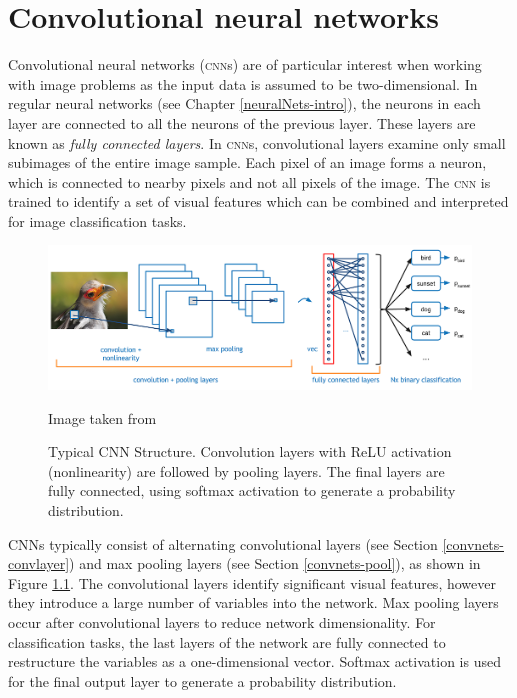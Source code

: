 


\chapter{Convolutional neural networks}\label{convnets}

Convolutional neural networks (\textsc{cnn}s) are of particular interest when working with image problems as the input data is assumed to be two-dimensional. In regular neural networks (see Chapter \ref{neuralNets-intro}), the neurons in each layer are connected to all the neurons of the previous layer. These layers are known as \textit{fully connected layers}. In \textsc{cnn}s, convolutional layers examine only small subimages of the entire image sample. Each pixel of an image forms a neuron, which is connected to nearby pixels and not all pixels of the image. The \textsc{cnn} is trained to identify a set of visual features which can be combined and interpreted for image classification tasks.

\begin{figure}[ht]
	\centering
	\includegraphics[width=\textwidth]{Images/4_cnn_structure.png}
	\caption{Typical CNN Structure. Convolution layers with ReLU activation (nonlinearity) are followed by pooling layers. The final layers are fully connected, using softmax activation to generate a probability distribution.}
	\small Image taken from \cite{ADeshpande2016}
	\label{convnets-structurefig}
\end{figure}

CNNs typically consist of alternating convolutional layers (see Section \ref{convnets-convlayer}) and max pooling layers (see Section \ref{convnets-pool}), as shown in Figure \ref{convnets-structurefig}. The convolutional layers identify significant visual features, however they introduce a large number of variables into the network. Max pooling layers occur after convolutional layers to reduce network dimensionality. For classification tasks, the last layers of the network are fully connected to restructure the variables as a one-dimensional vector. Softmax activation is used for the final output layer to generate a probability distribution.

